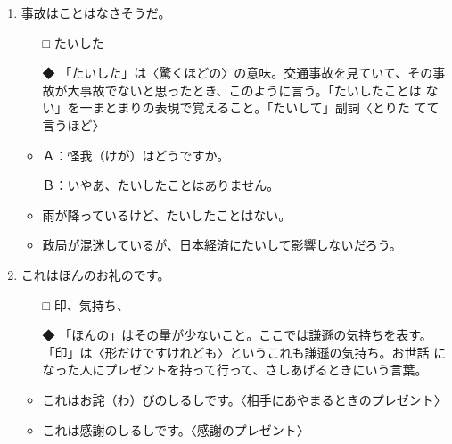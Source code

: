 \documentclass[
uplatex,
b5paper,
10pt,
dvipdfmx
]{jsbook}
\begin{document}
\begin{enumerate}
\item 事故は\underline{\hspace{3zw}}ことはなさそうだ。
\begin{itemize}
\item[□] たいした
\item[◆] 「たいした」は〈驚くほどの〉の意味。交通事故を見ていて、その事
	  故が大事故でないと思ったとき、このように言う。「たいしたことは
	  ない」を一まとまりの表現で覚えること。「たいして」副詞〈とりた
	  てて言うほど〉
\end{itemize}
\begin{itemize}
\item Ａ：怪我（けが）はどうですか。

      Ｂ：いやあ、たいしたことはありません。

\item 雨が降っているけど、たいしたことはない。
\item 政局が混迷しているが、日本経済にたいして影響しないだろう。
\end{itemize}
 
\item これはほんのお礼の\underline{\hspace{3zw}}です。
\begin{itemize}
\item[□] 印、気持ち、
\item[◆] 「ほんの」はその量が少ないこと。ここでは謙遜の気持ちを表す。
	  「印」は〈形だけですけれども〉というこれも謙遜の気持ち。お世話
	  になった人にプレゼントを持って行って、さしあげるときにいう言葉。
\end{itemize}
\begin{itemize}
\item これはお詫（わ）びのしるしです。〈相手にあやまるときのプレゼント〉
\item これは感謝のしるしです。〈感謝のプレゼント〉
\end{itemize}


\end{enumerate}
\end{document}
